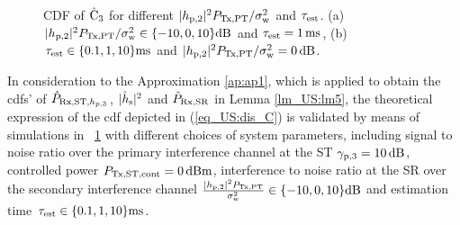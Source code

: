 \begin{figure}[!ht]
{\label{fig_US:CDF_C1_s}}
\hfil
{}
\vspace{0.3cm}
\caption{CDF of $\hat{\text{{C}}}_{\text{3}}$ for different $|h_{\text{p,2}}|^2 P_{\text{Tx,PT}}/\sigma^2_{\text{w}}$ and $\tau_{\text{est}}$. (a) $|h_{\text{p,2}}|^2 P_{\text{Tx,PT}}/\sigma^2_{\text{w}} \in \{-10, 0, 10\} \SI{}{dB}$ and $\tau_{\text{est}} = \SI{1}{ms}$, (b) $\tau_{\text{est}} \in \{0.1, 1, 10\} \SI{}{ms}$ and $|h_{\text{p,2}}|^2 P_{\text{Tx,PT}}/\sigma^2_{\text{w}} = \SI{0}{dB}$.}%
\label{fig_US:CDF_eca}
\vspace{-0.5cm}
\end{figure}
In consideration to the Approximation \ref{ap:ap1}, which is applied to obtain the cdfs' of $\hat{P}_{\text{Rx,ST,$h_{\text{p,3}}$}}$, $|\hat{h}_{\text{s}}|^2$ and $\hat{P}_{\text{Rx,SR}}$ in Lemma \ref{lm_US:lm5}, the theoretical expression of the cdf depicted in (\ref{eq_US:dis_C}) is validated by means of simulations in \figurename~\ref{fig_US:CDF_eca} with different choices of system parameters, including signal to noise ratio over the primary interference channel at the ST ${\gamma}_{\text{p,3}} = \SI{10}{dB}$, controlled power $P_{\text{Tx,ST,cont}} = \SI{0}{dBm}$, interference to noise ratio at the SR over the secondary interference channel $\frac{|h_{\text{p,2}}|^2 P_{\text{Tx,PT}}}{\sigma^2_{\text{w}}} \in \{-10, 0, 10\} \SI{}{dB}$ and estimation time $\tau_{\text{est}} \in \{0.1, 1, 10\} \SI{}{ms}$.

